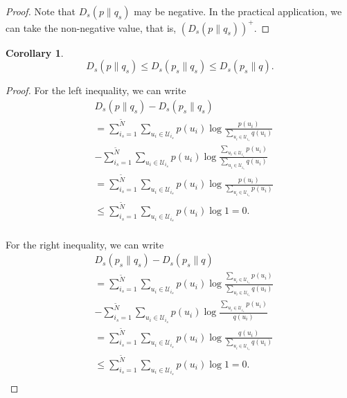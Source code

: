 \documentclass[12pt, draftclsnofoot,onecolumn]{IEEEtran}
\newtheorem{corollary}{\bf{Corollary}}
\begin{document}
\begin{proof}
Note that $D_s\left(p\|q_s\right)$ may be negative. In the practical application, we can take the non-negative value, that is, $\left(D_s\left(p\|q_s\right)\right)^{+}$.
\end{proof}

\begin{corollary}
\begin{equation}
D_s(p\|q_s)\leq D_s(p_s\|q_s) \leq D_s(p_s\|q).
\end{equation}
\end{corollary}
\begin{proof}
For the left inequality, we can write
\begin{equation}
\begin{aligned}
&D_s(p\|q_s)-D_s(p_s\|q_s) \\
&=\sum_{i_s=1}^{\tilde{N}}\sum_{u_i\in \mathcal{U}_{i_s}}p(u_i) \log \frac {p(u_i)}{\sum_{u_i\in \mathcal{U}_{i_s}} q(u_i)}\\
&-\sum_{i_s=1}^{\tilde{N}}\sum_{u_i\in \mathcal{U}_{i_s}}p(u_i) \log \frac{\sum_{u_i\in \mathcal{U}_{i_s}}p(u_i)}{\sum_{u_i\in \mathcal{U}_{i_s}} q(u_i)}\\
&=\sum_{i_s=1}^{\tilde{N}}\sum_{u_i\in \mathcal{U}_{i_s}}p(u_i) \log \frac{p(u_i)}{\sum_{u_i\in \mathcal{U}_{i_s}} p(u_i)}\\
&\leq \sum_{i_s=1}^{\tilde{N}}\sum_{u_i\in \mathcal{U}_{i_s}}p(u_i) \log 1=0.\\
\end{aligned}
\end{equation}

For the right inequality, we can write
\begin{equation}
\begin{aligned}
&D_s(p_s\|q_s)-D_s(p_s\|q)\\
&=\sum_{i_s=1}^{\tilde{N}}\sum_{u_i\in \mathcal{U}_{i_s}}p(u_i) \log \frac{\sum_{u_i\in \mathcal{U}_{i_s}}p(u_i)}{\sum_{u_i\in \mathcal{U}_{i_s}} q(u_i)}\\
&-\sum_{i_s=1}^{\tilde{N}}\sum_{u_i\in \mathcal{U}_{i_s}}p(u_i) \log \frac{\sum_{u_i\in \mathcal{U}_{i_s}} p(u_i)}{q(u_i)}\\
&=\sum_{i_s=1}^{\tilde{N}}\sum_{u_i\in \mathcal{U}_{i_s}}p(u_i) \log \frac{q(u_i)}{\sum_{u_i\in \mathcal{U}_{i_s}} q(u_i)}\\
&\leq \sum_{i_s=1}^{\tilde{N}}\sum_{u_i\in \mathcal{U}_{i_s}}p(u_i) \log 1=0.\\
\end{aligned}
\end{equation}
\end{proof}
\end{document}
